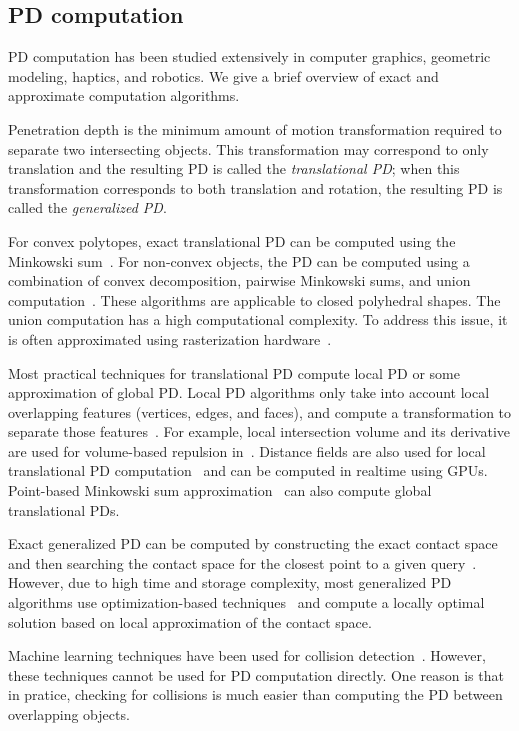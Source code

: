 \subsection{PD computation}
PD computation has been studied extensively in computer graphics,
geometric modeling, haptics, and robotics. We give a brief
overview of exact and approximate computation algorithms.

Penetration depth is the minimum amount of motion transformation required to separate two intersecting objects. This transformation may correspond to only translation and the resulting PD is called the \emph{translational PD}; when this transformation corresponds to both translation and rotation, the resulting PD is called the \emph{generalized PD}.

For convex polytopes, exact translational PD can be computed using
the Minkowski sum~\cite{Gino:2001:GDC,Agarwal:2000:CPD,Kim:2002:DEEP}.
For non-convex objects, the PD can be computed using a combination of convex decomposition, pairwise Minkowski sums, and union computation~\cite{Kim:2002:FPD}. These algorithms are applicable to closed polyhedral shapes. The union computation has a high computational complexity. To address this issue, it is often approximated using rasterization hardware~\cite{Kim:2002:FPD}.

Most practical techniques for translational PD compute local PD
or some approximation of global PD. Local PD algorithms only take
into account local overlapping features (vertices, edges, and faces),
and compute a transformation to separate those
features~\cite{Guendelman:2003:NRB,Redon:2006:AFM,Lien:2009:ASM,Tang:2009:IHD,Tang:2012:CPF}. For example, local intersection volume and its derivative are used for volume-based repulsion in~\cite{Wang12}.
Distance fields are also used for local translational PD
computation~\cite{Heidelberger04} and can be computed in realtime using GPUs.
Point-based Minkowski
sum approximation~\cite{Lien:2008:CMS} can also compute global translational PDs.

Exact generalized PD can be computed by constructing the
exact contact space and then searching the contact space for the
closest point to a given query~\cite{Zhang:2007:GPD}. However,
due to high time and storage complexity, most
generalized PD algorithms use optimization-based
techniques~\cite{Nawratil:2009:GPD,Zhang:2007:AFP,Je:2012:PRP} and compute a locally
optimal solution based on local approximation of the contact space.

Machine learning techniques have been used for collision detection~\cite{Doshi:2007:ISRR,Pan:2011:ISRR}. However, these techniques cannot be used for PD computation directly. One reason is that in pratice, checking for collisions is much easier than computing the PD between overlapping objects.

